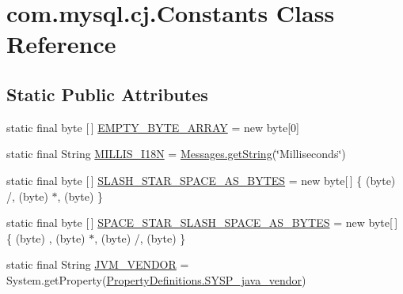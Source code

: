 \hypertarget{classcom_1_1mysql_1_1cj_1_1_constants}{}\section{com.\+mysql.\+cj.\+Constants Class Reference}
\label{classcom_1_1mysql_1_1cj_1_1_constants}
\subsection*{Static Public Attributes}
\begin{DoxyCompactItemize}
\item 
static final byte \mbox{[}$\,$\mbox{]} \mbox{\hyperlink{classcom_1_1mysql_1_1cj_1_1_constants_abc80f5c092cffb1a8a0f80f19e9eacf1}{E\+M\+P\+T\+Y\+\_\+\+B\+Y\+T\+E\+\_\+\+A\+R\+R\+AY}} = new byte\mbox{[}0\mbox{]}
\item 
static final String \mbox{\hyperlink{classcom_1_1mysql_1_1cj_1_1_constants_a8fc1f3a520cd5d66593984337c90ce3a}{M\+I\+L\+L\+I\+S\+\_\+\+I18N}} = \mbox{\hyperlink{classcom_1_1mysql_1_1cj_1_1_messages_a86a388448aa7759254c491b3e1320d31}{Messages.\+get\+String}}(\char`\"{}Milliseconds\char`\"{})
\item 
static final byte \mbox{[}$\,$\mbox{]} \mbox{\hyperlink{classcom_1_1mysql_1_1cj_1_1_constants_afebd0fbda69fa22898d79cab16aaadb5}{S\+L\+A\+S\+H\+\_\+\+S\+T\+A\+R\+\_\+\+S\+P\+A\+C\+E\+\_\+\+A\+S\+\_\+\+B\+Y\+T\+ES}} = new byte\mbox{[}$\,$\mbox{]} \{ (byte) \textquotesingle{}/\textquotesingle{}, (byte) \textquotesingle{}$\ast$\textquotesingle{}, (byte) \textquotesingle{} \textquotesingle{} \}
\item 
static final byte \mbox{[}$\,$\mbox{]} \mbox{\hyperlink{classcom_1_1mysql_1_1cj_1_1_constants_a0a96e131511732ac611127cb21b1e0c3}{S\+P\+A\+C\+E\+\_\+\+S\+T\+A\+R\+\_\+\+S\+L\+A\+S\+H\+\_\+\+S\+P\+A\+C\+E\+\_\+\+A\+S\+\_\+\+B\+Y\+T\+ES}} = new byte\mbox{[}$\,$\mbox{]} \{ (byte) \textquotesingle{} \textquotesingle{}, (byte) \textquotesingle{}$\ast$\textquotesingle{}, (byte) \textquotesingle{}/\textquotesingle{}, (byte) \textquotesingle{} \textquotesingle{} \}
\item 
static final String \mbox{\hyperlink{classcom_1_1mysql_1_1cj_1_1_constants_a0922e1d682357da9d24654920bbf141f}{J\+V\+M\+\_\+\+V\+E\+N\+D\+OR}} = System.\+get\+Property(\mbox{\hyperlink{classcom_1_1mysql_1_1cj_1_1conf_1_1_property_definitions_ade5a798ae5df535e089de31c110b5071}{Property\+Definitions.\+S\+Y\+S\+P\+\_\+java\+\_\+vendor}})
\item 

\end{DoxyCompactItemize}

